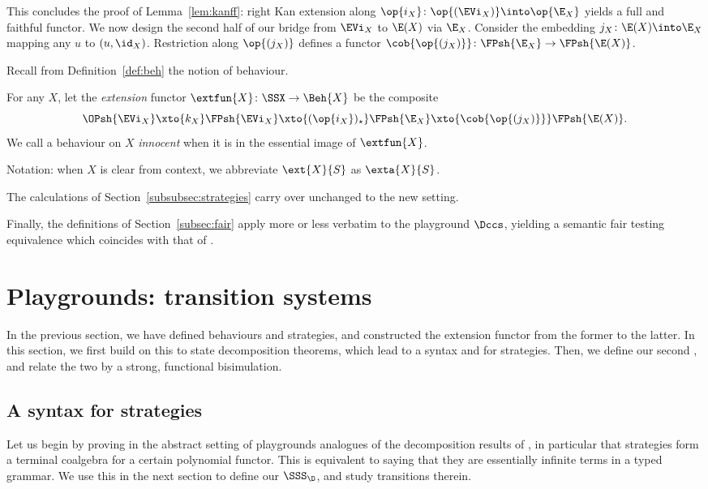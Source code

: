 \documentclass{LMCS}
\theoremstyle{plain}\newtheorem{satz}[thm]{Satz}
\begin{document}
  This concludes the proof of Lemma~\ref{lem:kanff}: right
  Kan extension along $\op{i_X} \colon \op{(\EVi_X)} \into \op{\E_X}$
  yields a full and faithful functor. We now design the second half of
  our bridge from $\EVi_X$ to $\E(X)$ via $\E_X$. Consider the
  embedding $j_X \colon \E (X) \into \E_X$ mapping any $u$ to $(u,
  \id_X)$. Restriction along $\op{(j_X)}$ defines a functor
  $\cob{\op{(j_X)}} \colon \FPsh{\E_X} \to \FPsh{\E (X)}$.

Recall from Definition~\ref{def:beh} the notion of behaviour.
\begin{defi}
  For any $X$, let the \emph{extension} functor $\extfun{X} \colon
  \SSX \to \Beh{X}$ be the composite 
  $$\OPsh{\EVi_X} \xto{k_X} \FPsh{\EVi_X} \xto{(\op{i_X})_\star} \FPsh{\E_X} \xto{\cob{\op{(j_X)}}} \FPsh{\E(X)}.$$
  We call a behaviour on $X$ \emph{innocent} when it is in the
  essential image of $\extfun{X}$.
\end{defi}
Notation: when $X$ is clear from context, we abbreviate $\ext{X}{S}$ as $\exta{X}{S}$.

\begin{rem}
  The calculations of Section~\ref{subsubsec:strategies} carry over
  unchanged to the new setting.
\end{rem}
Finally, the definitions of Section~\ref{subsec:fair} apply more or
less verbatim to the playground $\Dccs$, yielding a semantic fair
testing equivalence which coincides with that of .

\section{Playgrounds: transition systems}\label{sec:strats}
In the previous section, we have defined behaviours and strategies,
and constructed the extension functor from the former to the latter.
In this section, we first build on this to state decomposition
theorems, which lead to a syntax and \anlts{} for strategies. Then, we
define our second \lts{}, and relate the two by a strong, functional
bisimulation.

\subsection{A syntax for strategies}\label{subsec:syntax:strats}
Let us begin by proving in the abstract setting of playgrounds
analogues of the decomposition results of
, in particular that strategies form a
terminal coalgebra for a certain polynomial functor. This is
equivalent to saying that they are essentially infinite terms in a
typed grammar. We use this in the next section to define our \lts{}
$\SSS_\D$, and study transitions therein.
\end{document}

